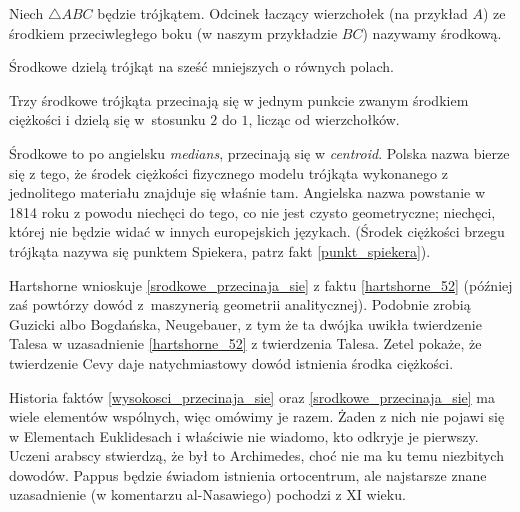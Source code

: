\begin{definition}[środkowa]
%
    Niech $\triangle ABC$ będzie trójkątem.
    Odcinek łaczący wierzchołek (na przykład $A$) ze środkiem przeciwległego boku (w naszym przykładzie $BC$) nazywamy środkową.
\end{definition}

Środkowe dzielą trójkąt na sześć mniejszych o równych polach.

\begin{proposition}
\label{srodkowe_przecinaja_sie}%
%
    Trzy środkowe trójkąta przecinają się w jednym punkcie zwanym środkiem ciężkości i dzielą się w~stosunku $2$ do $1$, licząc od wierzchołków.
\end{proposition}

Środkowe to po angielsku \emph{medians}, przecinają się w \emph{centroid}.
Polska nazwa bierze się z tego, że środek ciężkości fizycznego modelu trójkąta wykonanego z jednolitego materiału znajduje się właśnie tam.
%
Angielska nazwa powstanie w 1814 roku z powodu niechęci do tego, co nie jest czysto geometryczne; niechęci, której nie będzie widać w innych europejskich językach.
(Środek ciężkości brzegu trójkąta nazywa się punktem Spiekera, patrz fakt \ref{punkt_spiekera}).

Hartshorne \cite[s. 52-54]{hartshorne2000} wnioskuje \ref{srodkowe_przecinaja_sie} z faktu \ref{hartshorne_52} (później zaś \cite[s. 119-120]{hartshorne2000} powtórzy dowód z~maszynerią geometrii analitycznej).
%
Podobnie zrobią Guzicki \cite[s. 220]{guzicki_2021} albo Bogdańska, Neugebauer, z tym że ta dwójka uwikła twierdzenie Talesa w uzasadnienie \ref{hartshorne_52} z twierdzenia Talesa.
%
Zetel \cite[s. 14]{zetel_2020} pokaże, że twierdzenie Cevy daje natychmiastowy dowód istnienia środka ciężkości.

Historia faktów \ref{wysokosci_przecinaja_sie} oraz \ref{srodkowe_przecinaja_sie} ma wiele elementów wspólnych, więc omówimy je razem.
Żaden z nich nie pojawi się w Elementach Euklidesach i właściwie nie wiadomo, kto odkryje je pierwszy.
Uczeni arabscy stwierdzą, że był to Archimedes, choć nie ma ku temu niezbitych dowodów.
%
Pappus będzie świadom istnienia ortocentrum, ale najstarsze znane uzasadnienie (w komentarzu al-Nasawiego) pochodzi z XI wieku.
%
%

